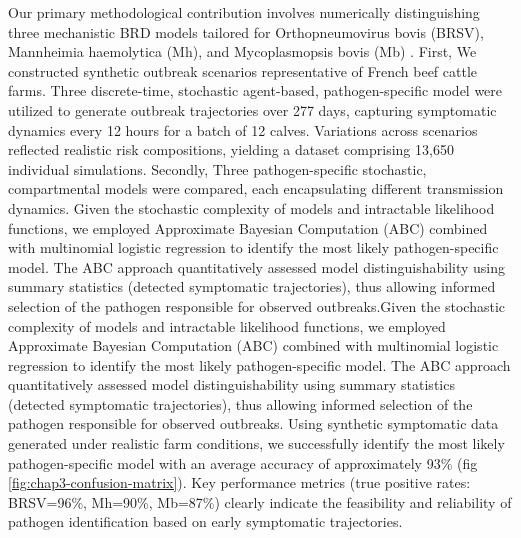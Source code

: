 Our primary methodological contribution involves numerically distinguishing three mechanistic BRD models tailored for Orthopneumovirus bovis (BRSV), Mannheimia haemolytica (Mh), and Mycoplasmopsis bovis (Mb) \cite{sorindupont_modeling_2023}. First, We constructed synthetic outbreak scenarios representative of French beef cattle farms. Three discrete-time, stochastic agent-based, pathogen-specific model  were utilized to generate outbreak trajectories over 277 days, capturing symptomatic dynamics every 12 hours for a batch of 12 calves. Variations across scenarios reflected realistic risk compositions, yielding a dataset comprising 13,650 individual simulations. Secondly, Three pathogen-specific stochastic, compartmental models \cite{sorindupont_modeling_2023} were compared, each encapsulating different transmission dynamics. Given the stochastic complexity of models and intractable likelihood functions, we employed Approximate Bayesian Computation (ABC) combined with multinomial logistic regression to identify the most likely pathogen-specific model. The ABC approach quantitatively assessed model distinguishability using summary statistics (detected symptomatic trajectories), thus allowing informed selection of the pathogen responsible for observed outbreaks.Given the stochastic complexity of models and intractable likelihood functions, we employed Approximate Bayesian Computation (ABC) combined with multinomial logistic regression to identify the most likely pathogen-specific model. The ABC approach quantitatively assessed model distinguishability using summary statistics (detected symptomatic trajectories), thus allowing informed selection of the pathogen responsible for observed outbreaks. Using synthetic symptomatic data generated under realistic farm conditions, we successfully identify the most likely pathogen-specific model with an average accuracy of approximately 93\% (fig \ref{fig:chap3-confusion-matrix}). Key performance metrics (true positive rates: BRSV=96\%, Mh=90\%, Mb=87\%) clearly indicate the feasibility and reliability of pathogen identification based on early symptomatic trajectories.

